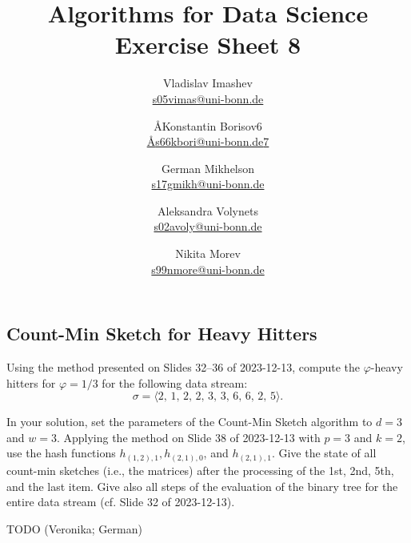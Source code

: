 \documentclass{article}
\title{Algorithms for Data Science \\ Exercise Sheet 8}
\author{
  Vladislav Imashev \\ \href{mailto:s05vimas@uni-bonn.de}{s05vimas@uni-bonn.de} \and
  \AA{Konstantin Borisov}{6} \\ \href{mailto:\AA{s66kbori@uni-bonn.de}{7}}{\AA{s66kbori@uni-bonn.de}{7}} \and
  German Mikhelson \\ \href{mailto:s17gmikh@uni-bonn.de}{s17gmikh@uni-bonn.de} \and
  Aleksandra Volynets \\ \href{mailto:s02avoly@uni-bonn.de}{s02avoly@uni-bonn.de} \and
  Nikita Morev \\ \href{mailto:s99nmore@uni-bonn.de}{s99nmore@uni-bonn.de}
}
\let\phi\varphi
\begin{document}
  \maketitle

  \setcounter{section}{8}
  \subsection{Count-Min Sketch for Heavy Hitters}
  \begin{centerframebox}
    Using the method presented on Slides 32--36 of 2023-12-13, compute the $\phi$-heavy
    hitters for $\phi = 1/3$ for the following data stream:
    $$\sigma = \langle2,\, 1,\, 2,\, 2,\, 3,\, 3,\, 6,\, 6,\, 2,\, 5\rangle.$$

    In your solution, set the parameters of the Count-Min Sketch algorithm to $d = 3$
    and $w = 3$. Applying the method on Slide 38 of 2023-12-13 with $p = 3$ and
    $k = 2$, use the hash functions $h_{(1,2),1}, h_{(2,1),0}$, and $h_{(2,1),1}$.
    Give the state of all count-min sketches (i.e., the matrices) after the processing
    of the 1st, 2nd, 5th, and the last item. Give also all steps of the evaluation of
    the binary tree for the entire data stream (cf. Slide 32 of 2023-12-13).
  \end{centerframebox}
  TODO (Veronika; German)
\end{document}

